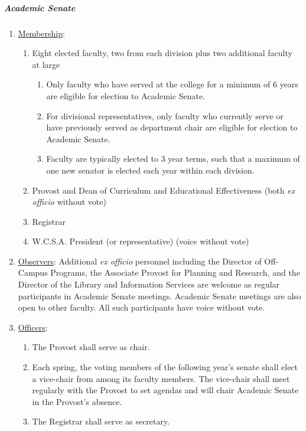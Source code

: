 				\subparagraph{Academic Senate}
					\begin{enumerate}[label=\alph*)]
						\item{\underline{Membership}:
							\begin{enumerate}[label=\arabic*)]
								\item{Eight elected faculty, two from each division plus two additional faculty at large
									\begin{enumerate}[label=(\alph*)]
										\item{Only faculty who have served at the college for a minimum of 6 years are eligible for election to Academic Senate.}
										\item{For divisional representatives, only faculty who currently serve or have previously served as department chair are eligible for election to Academic Senate.}
										\item{Faculty are typically elected to 3 year terms, such that a maximum of one new senator is elected each year within each division.}
									\end{enumerate}
								}
								\item{Provost and Dean of Curriculum and
									Educational Effectiveness (both \emph{ex officio} without vote)}
								\item{Registrar}
								\item{W.C.S.A. President (or representative) (voice without vote)}
							\end{enumerate}
						}
						\item{\underline{Observers}:  Additional \emph{ex officio} personnel including the Director of Off-Campus Programs, the Associate Provost for Planning and Research, and the Director of the Library and Information Services are welcome as regular participants in Academic Senate meetings.  Academic Senate meetings are also open to other faculty.  All such participants have voice without vote.}
						\item{\underline{Officers}:
							\begin{enumerate}[label=\arabic*)]
								\item{The Provost shall serve as chair.}
								\item{Each spring, the voting members of the following year's senate shall elect a vice-chair from among its faculty members.  The vice-chair shall meet regularly with the Provost to set agendas and will chair Academic Senate in the Provost's absence.}
								\item{The Registrar shall serve as secretary.}

\end{enumerate}}
\end{enumerate}
